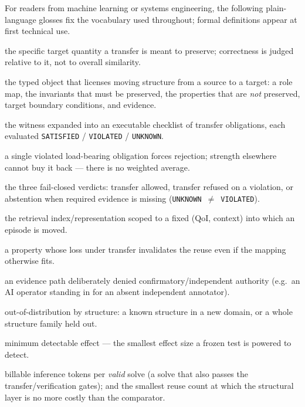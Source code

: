 For readers from machine learning or systems engineering, the following plain-language glosses fix the vocabulary used throughout; formal definitions appear at first technical use.

\begin{description}[leftmargin=1.4em,style=nextline]
\item[Quantity of interest (QoI)] the specific target quantity a transfer is meant to preserve; correctness is judged relative to it, not to overall similarity.
\item[Directional structural witness] the typed object that licenses moving structure from a source to a target: a role map, the invariants that must be preserved, the properties that are \emph{not} preserved, target boundary conditions, and evidence.
\item[Obligation set] the witness expanded into an executable checklist of transfer obligations, each evaluated \texttt{SATISFIED} / \texttt{VIOLATED} / \texttt{UNKNOWN}.
\item[Non-compensatory] a single violated load-bearing obligation forces rejection; strength elsewhere cannot buy it back --- there is no weighted average.
\item[\texttt{LICENSED} / \texttt{REJECTED} / \texttt{CANNOT\_CHECK}] the three fail-closed verdicts: transfer allowed, transfer refused on a violation, or abstention when required evidence is missing (\texttt{UNKNOWN}~$\neq$~\texttt{VIOLATED}).
\item[Fibre] the retrieval index/representation scoped to a fixed (QoI, context) into which an episode is moved.
\item[Forbidden loss] a property whose loss under transfer invalidates the reuse even if the mapping otherwise fits.
\item[Demoted evidence] an evidence path deliberately denied confirmatory/independent authority (e.g.\ an AI operator standing in for an absent independent annotator).
\item[Structural-OOD] out-of-distribution by structure: a known structure in a new domain, or a whole structure family held out.
\item[MDE] minimum detectable effect --- the smallest effect size a frozen test is powered to detect.
\item[TPVS; break-even count] billable inference tokens per \emph{valid} solve (a solve that also passes the transfer/verification gates); and the smallest reuse count at which the structural layer is no more costly than the comparator.
\end{description}
